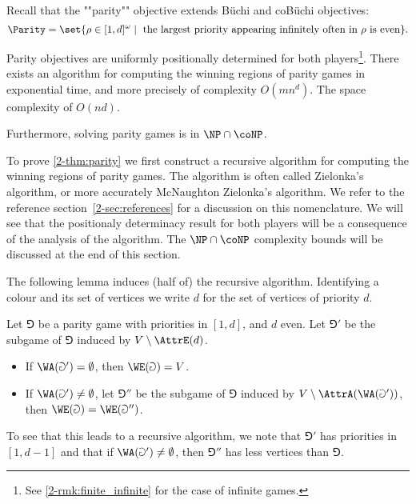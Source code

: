 Recall that the ""parity"" objective extends B{\"u}chi and coB{\"u}chi objectives:
\[
\Parity = \set{\rho \in [1,d]^\omega \mid \text{ the largest priority appearing infinitely often in } \rho \text{ is even}}.
\]

\begin{theorem}
\label{2-thm:parity}
Parity objectives are uniformly positionally determined for both players\footnote{See \cref{2-rmk:finite_infinite} for the case of infinite games.}.
There exists an algorithm for computing the winning regions of parity games in exponential time,
and more precisely of complexity $O(m n^d)$.
The space complexity of $O(nd)$.

Furthermore, solving parity games is in $\NP \cap \coNP$.
\end{theorem}

To prove \cref{2-thm:parity} we first construct a recursive algorithm for computing the winning regions of parity games.
The algorithm is often called Zielonka's algorithm, or more accurately McNaughton Zielonka's algorithm.
We refer to the reference section~\cref{2-sec:references} for a discussion on this nomenclature.
We will see that the positionaly determinacy result for both players will be a consequence of the analysis of the algorithm.
The $\NP \cap \coNP$ complexity bounds will be discussed at the end of this section.

The following lemma induces (half of) the recursive algorithm.
Identifying a colour and its set of vertices we write $d$ for the set of vertices of priority $d$.

\begin{lemma}
\label{2-lem:zielonka_even}
Let $\Game$ be a parity game with priorities in $[1,d]$, and $d$ even.
Let $\Game'$ be the subgame of $\Game$ induced by $V \setminus \AttrE(d)$.
\begin{itemize}
	\item If $\WA(\Game') = \emptyset$, then $\WE(\Game) = V$.
	\item If $\WA(\Game') \neq \emptyset$, 
	let $\Game''$ be the subgame of $\Game$ induced by $V \setminus \AttrA( \WA(\Game') )$,
	then $\WE(\Game) = \WE(\Game'')$.	
\end{itemize}
\end{lemma}

To see that this leads to a recursive algorithm, we note that $\Game'$ has priorities in $[1,d-1]$
and that if $\WA(\Game') \neq \emptyset$, then $\Game''$ has less vertices than $\Game$.


